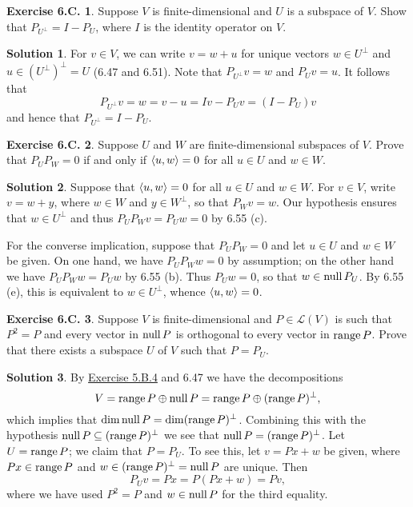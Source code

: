 \documentclass[12pt]{article}
\theoremstyle{definition}
\theoremstyle{exercise}
\newtheorem{exercise}{Exercise 6.C.}
\theoremstyle{solution}
\newtheorem*{solution}{Solution}
\newcommand{\lmap}{\mathcal{L}}
\newcommand{\Null}{\text{null\,}}
\newcommand{\Range}{\text{range\,}}
\newcommand{\ocomp}[1]{#1^{\perp}}
\DeclarePairedDelimiter\ip{\langle}{\rangle}
\begin{document}
\begin{exercise}
\label{ex:5}
    Suppose \( V \) is finite-dimensional and \( U \) is a subspace of \( V \). Show that \( P_{\ocomp{U}} = I - P_U \), where \( I \) is the identity operator on \( V \).
\end{exercise}

\begin{solution}
    For \( v \in V \), we can write \( v = w + u \) for unique vectors \( w \in \ocomp{U} \) and \( u \in \ocomp{(\ocomp{U})} = U \) (6.47 and 6.51). Note that \( P_{\ocomp{U}}v = w \) and \( P_Uv = u \). It follows that
    \[
        P_{\ocomp{U}}v = w = v - u = Iv - P_Uv = (I - P_U)v
    \]
    and hence that \( P_{\ocomp{U}} = I - P_U \).
\end{solution}

\begin{exercise}
\label{ex:6}
    Suppose \( U \) and \( W \) are finite-dimensional subspaces of \( V \). Prove that \( P_U P_W = 0 \) if and only if \( \ip{u, w} = 0 \) for all \( u \in U \) and \( w \in W \).
\end{exercise}

\begin{solution}
    Suppose that \( \ip{u, w} = 0 \) for all \( u \in U \) and \( w \in W \). For \( v \in V \), write \( v = w + y \), where \( w \in W \) and \( y \in \ocomp{W} \), so that \( P_W v = w \). Our hypothesis ensures that \( w \in \ocomp{U} \) and thus \( P_U P_W v = P_U w = 0 \) by 6.55 (c).

    For the converse implication, suppose that \( P_U P_W = 0 \) and let \( u \in U \) and \( w \in W \) be given. On one hand, we have \( P_U P_W w = 0 \) by assumption; on the other hand we have \( P_U P_W w = P_U w \) by 6.55 (b). Thus \( P_U w = 0 \), so that \( w \in \Null P_U \). By 6.55 (e), this is equivalent to \( w \in \ocomp{U} \), whence \( \ip{u, w} = 0 \).
\end{solution}

\begin{exercise}
\label{ex:7}
    Suppose \( V \) is finite-dimensional and \( P \in \lmap(V) \) is such that \( P^2 = P \) and every vector in \( \Null P \) is orthogonal to every vector in \( \Range P \). Prove that there exists a subspace \( U \) of \( V \) such that \( P = P_U \).
\end{exercise}

\begin{solution}
    By \href{https://lew98.github.io/Mathematics/LADR_Section_5_B_Exercises.pdf}{Exercise 5.B.4} and 6.47 we have the decompositions
    \[
        V = \Range P \oplus \Null P = \Range P \oplus \ocomp{(\Range P)},
    \]
    which implies that \( \dim \Null P = \dim \ocomp{(\Range P)} \). Combining this with the hypothesis \( \Null P \subseteq \ocomp{(\Range P)} \) we see that \( \Null P = \ocomp{(\Range P)} \). Let \( U = \Range P \); we claim that \( P = P_U \). To see this, let \( v = Px + w \) be given, where \( Px \in \Range P \) and \( w \in \ocomp{(\Range P)} = \Null P \) are unique. Then
    \[
        P_U v = Px = P(Px + w) = Pv,
    \]
    where we have used \( P^2 = P \) and \( w \in \Null P \) for the third equality.
\end{solution}
\end{document}
